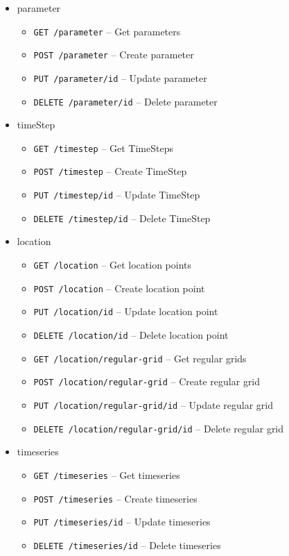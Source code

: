 \begin{itemize}
    \item parameter
    \begin{itemize}
        \item \texttt{GET /parameter} -- Get parameters
        \item \texttt{POST /parameter} -- Create parameter
        \item \texttt{PUT /parameter/id} -- Update parameter
        \item \texttt{DELETE /parameter/id} -- Delete parameter
    \end{itemize}
    \item timeStep
    \begin{itemize}
        \item \texttt{GET /timestep} -- Get TimeSteps
        \item \texttt{POST /timestep} -- Create TimeStep
        \item \texttt{PUT /timestep/id} -- Update TimeStep
        \item \texttt{DELETE /timestep/id} -- Delete TimeStep
    \end{itemize}
    \item location
    \begin{itemize}
        \item \texttt{GET /location} -- Get location points
        \item \texttt{POST /location} -- Create location point
        \item \texttt{PUT /location/id} -- Update location point
        \item \texttt{DELETE /location/id} -- Delete location point
        \item \texttt{GET /location/regular-grid} -- Get regular grids
        \item \texttt{POST /location/regular-grid} -- Create regular grid
        \item \texttt{PUT /location/regular-grid/id} -- Update regular grid
        \item \texttt{DELETE /location/regular-grid/id} -- Delete regular grid
    \end{itemize}
    \item timeseries
    \begin{itemize}
        \item \texttt{GET /timeseries} -- Get timeseries
        \item \texttt{POST /timeseries} -- Create timeseries
        \item \texttt{PUT /timeseries/id} -- Update timeseries
        \item \texttt{DELETE /timeseries/id} -- Delete timeseries
    \end{itemize}
\end{itemize}

